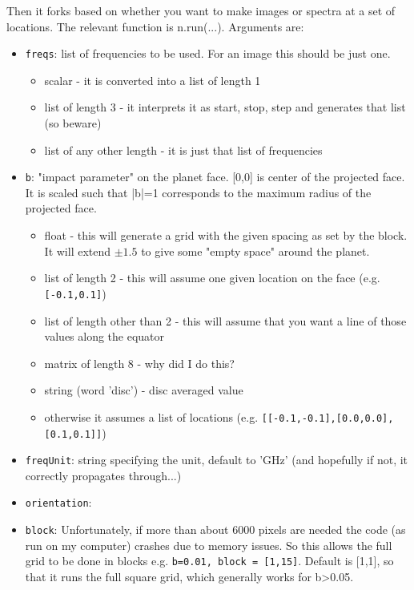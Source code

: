 \documentclass[11pt]{article}
\begin{document}
Then it forks based on whether you want to make images or spectra at a set of locations.  The relevant function is n.run(...).  Arguments are:
\begin{itemize}
\item \texttt{freqs}:   list of frequencies to be used. For an image this should be just one.
	\begin{itemize}
	\item scalar - it is converted into a list of length 1
	\item list of length 3 - it interprets it as start, stop, step and generates that list (so beware)
        \item list of any other length - it is just that list of frequencies
	\end{itemize}
\item \texttt{b}:  "impact parameter" on the planet face.  [0,0] is center of the projected face.  It is scaled such that |b|=1 corresponds to the maximum radius of the projected face.
	\begin{itemize}
	\item float - this will generate a grid with the given spacing as set by the block.  It will extend $\pm 1.5$ to give some "empty space" around the planet.
	\item list of length 2 - this will assume one given location on the face (e.g. \texttt{[-0.1,0.1]})
	\item list of length other than 2 - this will assume that you want a line of those values along the equator
	\item matrix of length 8 - why did I do this?
	\item string (word 'disc') - disc averaged value
	\item otherwise it assumes a list of locations (e.g. \texttt{[[-0.1,-0.1],[0.0,0.0],[0.1,0.1]]})
	\end{itemize}
\item \texttt{freqUnit}:  string specifying the unit, default to 'GHz' (and hopefully if not, it correctly propagates through...)
\item \texttt{orientation}:  
\item \texttt{block}:  Unfortunately, if more than about 6000 pixels are needed the code (as run on my computer) crashes due to memory issues.  So this allows the full grid to be done in blocks e.g. \texttt{b=0.01, block = [1,15]}.  Default is [1,1], so that it runs the full square grid, which generally works for b>0.05.
\end{itemize}
\end{document}
